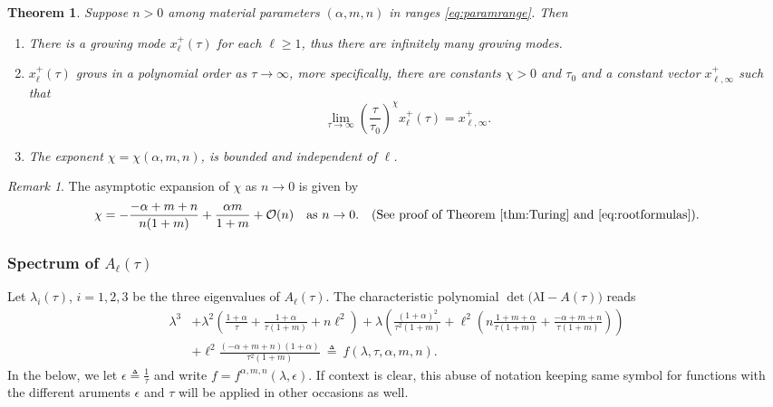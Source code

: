 \documentclass[a4paper,11pt]{article}
\def\l{{\ell}}
\newtheorem{theorem}{Theorem}
\theoremstyle{remark}
\newtheorem{remark}{Remark}[section]
\begin{document}
\begin{theorem} \label{thm:Turing} Suppose $n>0$ among material parameters $(\alpha,m,n)$ in ranges \eqref{eq:paramrange}. Then
  \begin{enumerate}
    \item There is a growing mode $x_\ell^+(\tau)$ for each $\ell\ge1$, thus there are  infinitely many growing modes.
    \item $x_\ell^+(\tau)$ grows in a polynomial order as $\tau \rightarrow \infty$, more specifically, there are constants $\chi>0$ and $\tau_0$ and a constant vector $x_{\ell,\infty}^+$ such that
    \begin{equation}
      \lim_{\tau \rightarrow \infty} \left(\frac{\tau}{\tau_0}\right)^{\chi} x_\ell^+(\tau) = x_{\ell,\infty}^+.
    \end{equation}
    \item The exponent $\chi=\chi(\alpha,m,n)$, is bounded and independent of $\ell$.
  \end{enumerate}
\end{theorem}
\begin{remark}
 The asymptotic expansion of $\chi$ as $n \rightarrow 0$ is given by
\begin{align*}
 \chi = -\frac{-\alpha+m+n}{n(1+m)} + \frac{\alpha m}{1+m} + \mathcal{O}(n) \quad \text{as } n \rightarrow 0. \quad \text{(See proof of Theorem \ref{thm:Turing} and \eqref{eq:rootformulas})}.%
\end{align*}
\end{remark}
\subsubsection{Spectrum of $A_\ell(\tau)$}

Let $\lambda_i(\tau)$, $i=1,2,3$ be the three eigenvalues of $A_\ell(\tau)$. %
The characteristic polynomial $\det\big(\lambda \textrm{I} - A(\tau)\big)$ reads
\begin{equation}
\begin{aligned}
 \lambda^3 &+ \lambda^2\left( \tfrac{1+\alpha}{\tau} + \tfrac{1+\alpha}{\tau(1+m)} + n\l^2\right)
 + \lambda\left( \tfrac{(1+\alpha)^2}{\tau^2(1+m)}
 + \l^2\left( n\tfrac{1+m+\alpha}{\tau(1+m)} + \tfrac{-\alpha+m+n}{\tau(1+m)}\right)\right) \\
 &+ \l^2\tfrac{(-\alpha+m+n)(1+\alpha)}{\tau^2(1+m)} \: \triangleq \: f(\lambda,\tau,\alpha,m,n). \label{eq:poly}
\end{aligned}
\end{equation}
In the below, we let $\epsilon\triangleq \frac{1}{\tau}$ and write $f = f^{\alpha,m,n}(\lambda,\epsilon)$. If context is clear, this abuse of notation keeping same symbol for functions with the different aruments $\epsilon$ and $\tau$ will be applied in other occasions as well.
\end{document}
